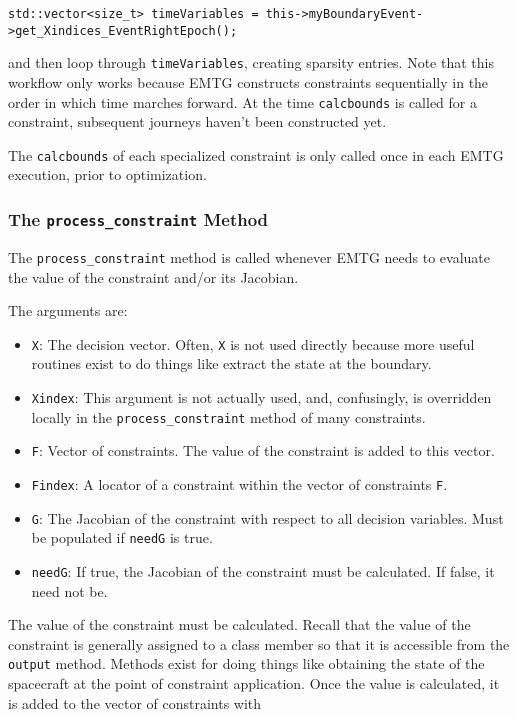 \documentclass[11pt]{article}
\begin{document}
\begin{verbatim}
std::vector<size_t> timeVariables = this->myBoundaryEvent->get_Xindices_EventRightEpoch();
\end{verbatim}

\noindent and then loop through \texttt{timeVariables}, creating sparsity entries. Note that this workflow only works because EMTG constructs constraints sequentially in the order in which time marches forward. At the time \texttt{calcbounds} is called for a constraint, subsequent journeys haven't been constructed yet.

The \texttt{calcbounds} of each specialized constraint is only called once in each EMTG execution, prior to optimization.

\subsubsection{The \texttt{process\_constraint} Method}

The \texttt{process\_constraint} method is called whenever EMTG needs to evaluate the value of the constraint and/or its Jacobian.

The arguments are:

\begin{itemize}
	\item \texttt{X}: The decision vector. Often, \texttt{X} is not used directly because more useful routines exist to do things like extract the state at the boundary.
	\item \texttt{Xindex}: This argument is not actually used, and, confusingly, is overridden locally in the \texttt{process\_constraint} method of many constraints.
	\item \texttt{F}: Vector of constraints. The value of the constraint is added to this vector.
	\item \texttt{Findex}: A locator of a constraint within the vector of constraints \texttt{F}.
	\item \texttt{G}: The Jacobian of the constraint with respect to all decision variables. Must be populated if \texttt{needG} is true.
	\item \texttt{needG}: If true, the Jacobian of the constraint must be calculated. If false, it need not be.
\end{itemize}

The value of the constraint must be calculated. Recall that the value of the constraint is generally assigned to a class member so that it is accessible from the \texttt{output} method. Methods exist for doing things like obtaining the state of the spacecraft at the point of constraint application. Once the value is calculated, it is added to the vector of constraints with
\end{document}
